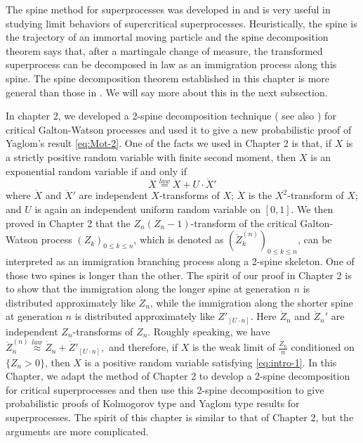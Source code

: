 \documentclass[UTF8]{pkuthss}
\theoremstyle{plain}
\theoremstyle{definition}
\numberwithin{equation}{section}
\begin{document}
The spine method for superprocesses was
	developed in \cite{EckhoffKyprianouWinkel2015Spines, EnglanderKyprianou2004Local, LiuRenSong2009LlogL} and is very useful in studying limit behaviors of supercritical superprocesses.
	Heuristically, the spine is the trajectory of an immortal moving particle and the spine decomposition theorem says that, after a martingale change of measure, the transformed superprocess can be decomposed in law as an immigration process along this spine.
	The spine decomposition theorem established in this chapter is more general than those in \cite{EckhoffKyprianouWinkel2015Spines, EnglanderKyprianou2004Local, LiuRenSong2009LlogL}.
   We will say more about this in the next subsection.

	In chapter 2, we developed a 2-spine decomposition technique ( see also \cite{RenSongSun2018A-2-spine}) for critical Galton-Watson processes
	and used it to give a new probabilistic proof of Yaglom's result \eqref{eq:Mot-2}.
	One of the facts we used in Chapter 2 is that, if $X$ is a strictly positive random variable with finite second moment,
	then $X$ is an exponential random variable if and only if
\begin{equation}\label{eq:intro-1}
	\ddot X
	\overset{law}{=} \dot X + U \cdot \dot X'
\end{equation}
	where $\dot X$ and $\dot X'$ are independent $X$-transforms of $X$;
	$\ddot X$ is the $X^2$-transform of $X$;
	and $U$ is again an independent uniform random variable on $[0,1]$.
	We then proved in Chapter 2 that the $Z_n(Z_n-1)$-transform of the critical Galton-Watson process $(Z_k)_{0\leq k\leq n}$, which is denoted as $(\ddot Z_k^{(n)})_{0\leq k\leq n}$, can be interpreted as an immigration branching process along a 2-spine skeleton.
	One of those two spines is longer than the other.
	The spirit of our proof in Chapter 2 is to show that the immigration along the longer spine at generation $n$ is distributed approximately like $\dot Z_n$, while the immigration along the shorter spine at generation $n$ is distributed approximately like $\dot Z'_{[U\cdot n]}$.
	Here $\dot Z_n$ and $\dot Z_n'$ are independent $Z_n$-transforms of $Z_n$.
	Roughly speaking, we have
$
	\ddot Z_n^{(n)}
	\overset{law}{\approx} \dot Z_n + \dot Z'_{[U\cdot n]},
$
	and therefore, if $X$ is the weak limit of $\frac{Z_n}{n}$ conditioned on $\{Z_n>0\}$, then $X$ is a positive random variable satisfying \eqref{eq:intro-1}.
In this Chapter, we adapt the method of Chapter 2 to develop a 2-spine
decomposition for critical superprocesses and then use this 2-spine decomposition to give
probabilistic proofs of Kolmogorov type and Yaglom type results for superprocesses. The spirit of this chapter is similar to that of Chapter 2, but the arguments are more
complicated.
\end{document}
